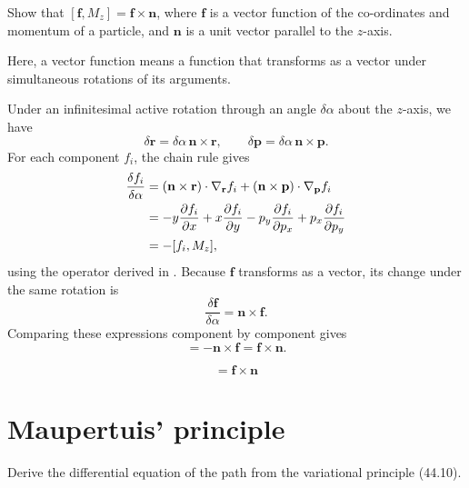 \begin{problem}[title={Bracket of a vector function with \texorplain{$M_z$}{M\_z}}]
{
Show that $[\mathbf{f}, M_z] = \mathbf{f} \times \mathbf{n}$, where $\mathbf{f}$ is a vector function of the co-ordinates and momentum of a particle, and $\mathbf{n}$ is a unit vector parallel to the $z$-axis.
}
{
Here, a vector function means a function that transforms as a vector under simultaneous rotations of its arguments.

Under an infinitesimal active rotation through an angle $\delta\alpha$ about the $z$-axis, we have
\begin{equation*}
    \delta\mathbf{r} = \delta\alpha\,\mathbf{n}\times\mathbf{r}, \qquad \delta\mathbf{p} = \delta\alpha\,\mathbf{n}\times\mathbf{p}.
\end{equation*}
For each component $f_i$, the chain rule gives
\begin{align*}
    \frac{\delta f_i}{\delta\alpha} &= \left(\mathbf{n}\times\mathbf{r}\right)\cdot\nabla_{\mathbf{r}}f_i + \left(\mathbf{n}\times\mathbf{p}\right)\cdot\nabla_{\mathbf{p}}f_i \\
    &= -y\frac{\partial f_i}{\partial x} + x\frac{\partial f_i}{\partial y} - p_y\frac{\partial f_i}{\partial p_x} + p_x\frac{\partial f_i}{\partial p_y} \\
    &= -[f_i, M_z],
\end{align*}
using the operator derived in . Because $\mathbf{f}$ transforms as a vector, its change under the same rotation is
\begin{equation*}
    \frac{\delta\mathbf{f}}{\delta\alpha} = \mathbf{n}\times\mathbf{f}.
\end{equation*}
Comparing these expressions component by component gives
\begin{equation*}
    [\mathbf{f}, M_z] = -\mathbf{n}\times\mathbf{f} = \mathbf{f}\times\mathbf{n}.
\end{equation*}
}
{
\begin{equation*}
    [\mathbf{f}, M_z] = \mathbf{f}\times\mathbf{n}
\end{equation*}
}
\end{problem}

\section{Maupertuis' principle}


\begin{problem}[title={Path equation from Maupertuis' principle}]
{
Derive the differential equation of the path from the variational principle (44.10).
}
{}
{}
\end{problem}

